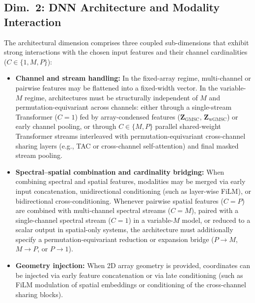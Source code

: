 \documentclass[lettersize,journal]{IEEEtran}
\begin{document}
\subsection{Dim.~2: DNN Architecture and Modality Interaction}
\label{sec:dim_architecture}
The architectural dimension comprises three coupled sub-dimensions that exhibit strong interactions with the chosen input features and their channel cardinalities ($C \in \{1, M, P\}$):
\begin{itemize}
  \item \textbf{Channel and stream handling:} In the fixed-array regime, multi-channel or pairwise features may be flattened into a fixed-width vector. In the variable-$M$ regime, architectures must be structurally independent of $M$ and permutation-equivariant across channels: either through a single-stream Transformer ($C = 1$) fed by array-condensed features ($\mathbf{Z}_{\mathrm{GMSC}}$, $\mathbf{Z}_{\mathrm{wGMSC}}$) or early channel pooling, or through $C \in \{M, P\}$ parallel shared-weight Transformer streams interleaved with permutation-equivariant cross-channel sharing layers (e.g., \gls{TAC} or cross-channel self-attention) and final masked stream pooling.
  \item \textbf{Spectral--spatial combination and cardinality bridging:} When combining spectral and spatial features, modalities may be merged via early input concatenation, unidirectional conditioning (such as layer-wise \gls{FiLM}), or bidirectional cross-conditioning. Whenever pairwise spatial features ($C = P$) are combined with multi-channel spectral streams ($C = M$), paired with a single-channel spectral stream ($C = 1$) in a variable-$M$ model, or reduced to a scalar output in spatial-only systems, the architecture must additionally specify a permutation-equivariant reduction or expansion bridge ($P \to M$, $M \to P$, or $P \to 1$).
  \item \textbf{Geometry injection:} When 2D array geometry is provided, coordinates can be injected via early feature concatenation or via late conditioning (such as \gls{FiLM} modulation of spatial embeddings or conditioning of the cross-channel sharing blocks).
\end{itemize}
\end{document}
